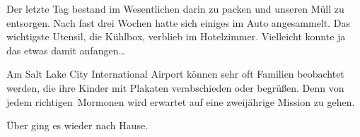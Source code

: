 Der letzte Tag bestand im Wesentlichen darin zu packen und unseren Müll zu entsorgen.
Nach fast drei Wochen  hatte sich einiges im Auto angesammelt.
Das wichtigste Utensil, die Kühlbox, verblieb im Hotelzimmer.
Vielleicht konnte ja das  etwas damit anfangen\dots

Am Salt Lake City International Airport können sehr oft Familien beobachtet werden, die ihre Kinder mit Plakaten verabschieden oder begrüßen.
Denn von jedem \glqq richtigen\grqq\, Mormonen wird erwartet auf eine zweijährige Mission zu gehen.

Über  ging es wieder nach Hause.
